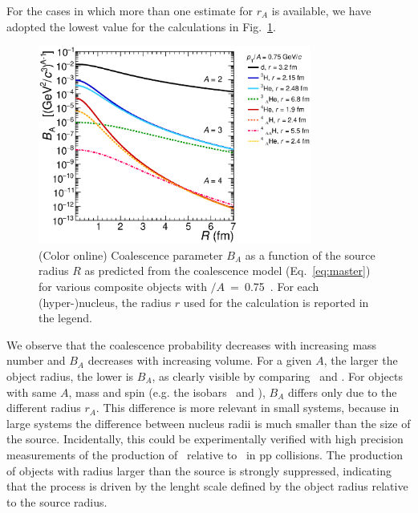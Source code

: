 \documentclass{appolb}
\begin{document}
For the cases in which more than one estimate for $r_A$ is available, we have adopted the lowest value for the calculations in Fig.~\ref{Fig:BA}.
%
%
\begin{figure}[htb]
\begin{center}
\includegraphics[width=0.8\textwidth]{coalescenceBA075.eps}
\caption{(Color online) Coalescence parameter $B_A$ as a function of the source radius $R$ as predicted from the coalescence model (Eq.~\ref{eq:master}) for various composite objects with \pt$/A$~=~0.75~\GeVc. For each (hyper-)nucleus, the radius $r$ used for the calculation is reported in the legend.}
\label{Fig:BA}
\end{center}
\end{figure} 
%
%
We observe that the coalescence probability decreases with increasing mass number and $B_A$ decreases with increasing volume. 
For a given $A$, the larger the object radius, the lower is $B_A$, as clearly visible by comparing \hethree~and \hthreelambda. 
For objects with same $A$, mass and spin (e.g. the isobars \tritium~and \hethree), $B_A$ differs only due to the different radius $r_A$. 
This difference is more relevant in small systems, because in large systems the difference between nucleus radii is much smaller than the size of the source.  
Incidentally, this could be experimentally verified with high precision measurements of the production of \tritium~relative to \hethree~in pp collisions. 
The production of objects with radius larger than the source is strongly suppressed, indicating that the process is driven by the lenght scale defined by the object radius relative to the source radius.
\end{document}
